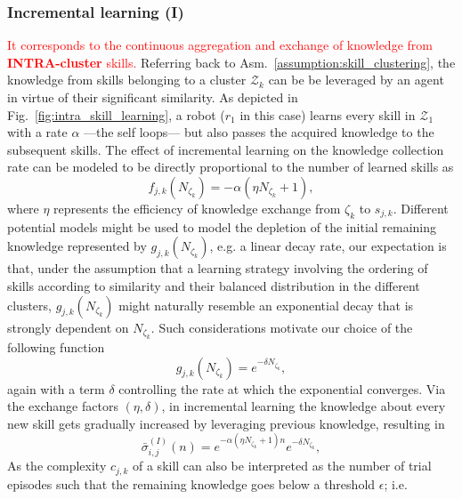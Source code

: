 \subsubsection{\textbf{Incremental learning (I)}}
\textcolor{red}{It corresponds to the continuous aggregation and exchange of knowledge from \textbf{INTRA-cluster} skills.} Referring back to Asm.~\ref{assumption:skill_clustering}, the knowledge from skills belonging to a cluster ${\mathcal{Z}_k}$ can be be leveraged by an agent in virtue of their significant similarity. As depicted in Fig.~\ref{fig:intra_skill_learning}, a robot ($r_1$ in this case) learns every skill in $\mathcal{Z}_1$ with a rate $\alpha$ ---the self loops--- but also passes the acquired knowledge to the subsequent skills. The effect of incremental learning on the knowledge collection rate can be modeled to be directly proportional to the number of learned skills as
\begin{equation}\label{eq:f_function}
	f_{j,k}\left(N_{\zeta_k}\right) = -\alpha\left(\eta N_{\zeta_k} + 1 \right) ,
\end{equation}
where $\eta$ represents the efficiency of knowledge exchange from $\zeta_k$ to $s_{j,k}$. Different potential models might be used to model the depletion of the initial remaining knowledge represented by $g_{j,k}\left(N_{\zeta_k}\right)$, e.g. a linear decay rate, our expectation is that, under the assumption that a learning strategy involving the ordering of skills according to similarity and their balanced distribution in the different clusters, $g_{j,k}\left(N_{\zeta_k}\right)$ might naturally resemble an exponential decay that is strongly dependent on $N_{\zeta_k}$. Such considerations motivate our choice of the following function
\begin{equation}\label{eq:g_function}
	g_{j,k}\left(N_{\zeta_k}\right) = e^{-\delta N_{\zeta_k}},
\end{equation}
again with a term $\delta$ controlling the rate at which the exponential converges. Via the exchange factors $(\eta,\delta)$, in incremental learning the knowledge about every new skill gets gradually increased by leveraging previous knowledge, resulting in
\begin{equation*}\label{eq:remaining_knowledge__IL}
	\bar{\sigma}^{(I)}_{i,j}(n) = e^{-\alpha  \left(\eta N_{\zeta_k}+1\right) n} e^{-\delta N_{\zeta_k}},
\end{equation*}
As the complexity $c_{j,k}$ of a skill can also be interpreted as the number of trial episodes such that the remaining knowledge goes below a threshold $\epsilon$; i.e.
